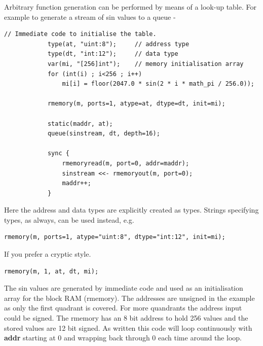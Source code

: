         Arbitrary function generation can be performed by means of a
        look-up table. For example to generate a stream of sin values
        to a queue -
        \begin{lstlisting}[gobble=8, language=threepl]
            // Immediate code to initialise the table.
            type(at, "uint:8");     // address type
            type(dt, "int:12");     // data type
            var(mi, "[256]int");    // memory initialisation array
            for (int(i) ; i<256 ; i++)
                mi[i] = floor(2047.0 * sin(2 * i * math_pi / 256.0));

            rmemory(m, ports=1, atype=at, dtype=dt, init=mi);

            static(maddr, at);
            queue(sinstream, dt, depth=16);

            sync {
                rmemoryread(m, port=0, addr=maddr);
                sinstream <<- rmemoryout(m, port=0);
                maddr++;
            }
        \end{lstlisting}
        Here the address and data types are explicitly created as
        types. Strings specifying types, as always, can be used instead, e.g.
        \begin{lstlisting}[gobble=8, language=threepl]
            rmemory(m, ports=1, atype="uint:8", dtype="int:12", init=mi);
        \end{lstlisting}
        
        If you prefer a cryptic style.
        \begin{lstlisting}[gobble=8, language=threepl]
            rmemory(m, 1, at, dt, mi);
        \end{lstlisting}
        
        The sin values are generated by immediate code and used as an
        initialisation array for the block RAM (rmemory). The addresses are
        unsigned in the example as only the first quadrant is covered. For more
        quandrants the address input could be signed. The rmemory has an 8 bit
        address to hold 256 values and the stored values are 12 bit signed. As
        written this code will loop continuously with {\bf addr} starting at 0
        and wrapping back through 0 each time around the loop.
        

